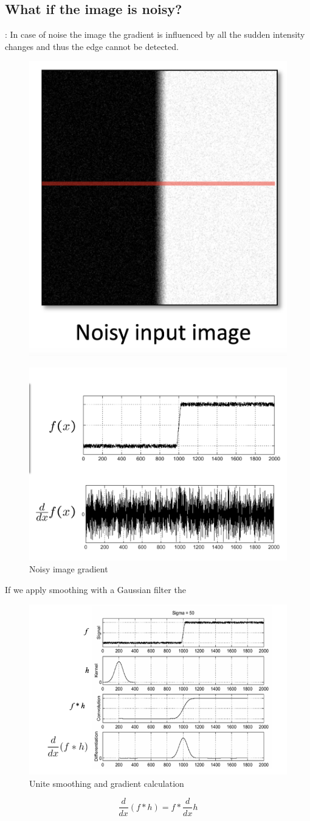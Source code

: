 \subsection*{What if the image is noisy?}:
In case of noise the image the gradient is influenced by all the sudden intensity changes and thus the edge cannot be detected.
\begin{figure}[H]
    \centering
    \includegraphics[width=0.5\linewidth]{Pictures/noisy_image.png}
\end{figure}

\begin{figure}[H]
    \centering
    \includegraphics[width=0.6\linewidth]{Pictures/noisy_image_gradient.png}
    \caption{Noisy image gradient}
\end{figure}

If we apply smoothing with a Gaussian filter the





\begin{figure}[H]
    \centering
    \includegraphics[width=0.6\linewidth]{Pictures/smoothing_and_gradient.png}
    \caption{Unite smoothing and gradient calculation}
    \label{fig:smoothing_and_gradient}
\end{figure}
\[
    \frac{d}{dx} (f * h) = f * \frac{d}{dx} h
\]



